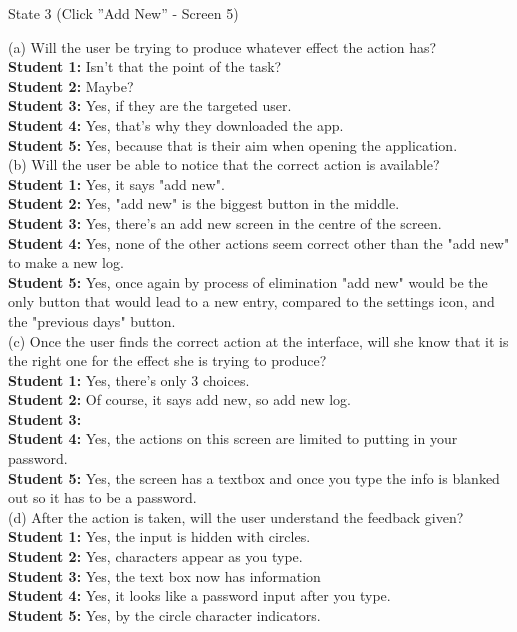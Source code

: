 \documentclass[pdftex,12pt,a4paper]{report}
\begin{document}
\begin{center}
State 3 (Click ''Add New'' - Screen 5)
\end{center}

(a) Will the user be trying to produce whatever effect the action has?
\\\indent \textbf{Student 1:} Isn't that the point of the task?
\\\indent \textbf{Student 2:} Maybe? 
\\\indent \textbf{Student 3:} Yes, if they are the targeted user.
\\\indent \textbf{Student 4:} Yes, that's why they downloaded the app.
\\\indent \textbf{Student 5:} Yes, because that is their aim when opening the application.
\\(b) Will the user be able to notice that the correct action is available?
\\\indent \textbf{Student 1:} Yes, it says "add new".
\\\indent \textbf{Student 2:} Yes, "add new" is the biggest button in the middle.
\\\indent \textbf{Student 3:} Yes, there's an add new screen in the centre of the screen.
\\\indent \textbf{Student 4:} Yes, none of the other actions seem correct other than the "add new" to make a new log.
\\\indent \textbf{Student 5:} Yes, once again by process of elimination "add new" would be the only button that would lead to a new entry, compared to the settings icon, and the "previous days" button.
\\(c) Once the user finds the correct action at the interface, will she know that it is the right one for the effect she is trying to produce?
\\\indent \textbf{Student 1:} Yes, there's only 3 choices.
\\\indent \textbf{Student 2:} Of course, it says add new, so add new log.
\\\indent \textbf{Student 3:} 
\\\indent \textbf{Student 4:} Yes, the actions on this screen are limited to putting in your password.
\\\indent \textbf{Student 5:} Yes, the screen has a textbox and once you type the info is blanked out so it has to be a password.
\\(d) After the action is taken, will the user understand the feedback given?
\\\indent \textbf{Student 1:} Yes, the input is hidden with circles.
\\\indent \textbf{Student 2:} Yes, characters appear as you type.
\\\indent \textbf{Student 3:} Yes, the text box now has information
\\\indent \textbf{Student 4:} Yes, it looks like a password input after you type.
\\\indent \textbf{Student 5:} Yes, by the circle character indicators.
\end{document}
